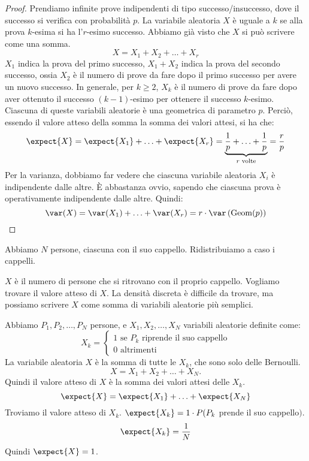\begin{proof}
Prendiamo infinite prove indipendenti di tipo successo/insuccesso, dove il successo si verifica con probabilit\`a $p$. La variabile aleatoria $X$ \`e uguale a $k$ se alla prova $k$-esima si ha l'$r$-esimo successo. Abbiamo gi\`a visto che $X$ si pu\`o scrivere come una somma.
\[
X = X_1 + X_2 + \ldots + X_r
\]
$X_1$ indica la prova del primo successo, $X_1 + X_2$ indica la prova del secondo successo, ossia $X_2$ \`e il numero di prove da fare dopo il primo successo per avere un nuovo successo. In generale, per $k \ge 2$, $X_k$ \`e il numero di prove da fare dopo aver ottenuto il successo $(k-1)$-esimo per ottenere il successo $k$-esimo. Ciascuna di queste variabili aleatorie \`e una geometrica di parametro $p$. Perci\`o, essendo il valore atteso della somma la somma dei valori attesi, si ha che:
\[
\expect{X} = \expect{X_1} + \ldots + \expect{X_r} = \underbrace{\frac{1}{p} + \ldots + \frac{1}{p}}_{r \text{ volte}} = \frac{r}{p}
\]
Per la varianza, dobbiamo far vedere che ciascuna variabile aleatoria $X_i$ \`e indipendente dalle altre. \`E abbastanza ovvio, sapendo che ciascuna prova \`e operativamente indipendente dalle altre. Quindi:
\[
\var(X) = \var(X_1) + \ldots + \var(X_r) = r \cdot \var \left( \operatorname{Geom}(p) \right)
\]
\end{proof}

\begin{exmp}
Abbiamo $N$ persone, ciascuna con il suo cappello. Ridistribuiamo a caso i cappelli.

$X$ \`e il numero di persone che si ritrovano con il proprio cappello. Vogliamo trovare il valore atteso di $X$. La densit\`a discreta \`e difficile da trovare, ma possiamo scrivere $X$ come somma di variabili aleatorie pi\`u semplici.

Abbiamo $P_1, P_2, \ldots, P_N$ persone, e $X_1, X_2, \ldots, X_N$ variabili aleatorie definite come:
\[
X_k = 
\begin{cases}
1 \text{ se $P_k$ riprende il suo cappello} \\
0 \text{ altrimenti}
\end{cases}
\]
La variabile aleatoria $X$ \`e la somma di tutte le $X_k$, che sono solo delle Bernoulli.
\[
X = X_1 + X_2 + \ldots + X_N.
\]
Quindi il valore atteso di $X$ \`e la somma dei valori attesi delle $X_k$.
\[
\expect{X} = \expect{X_1} + \ldots + \expect{X_N}
\]
Troviamo il valore atteso di $X_k$. $\expect{X_k} = 1 \cdot P (P_k$ prende il suo cappello$)$.
\[
\expect{X_k} = \frac{1}{N}
\]
Quindi $\expect{X} = 1$.
\end{exmp}

